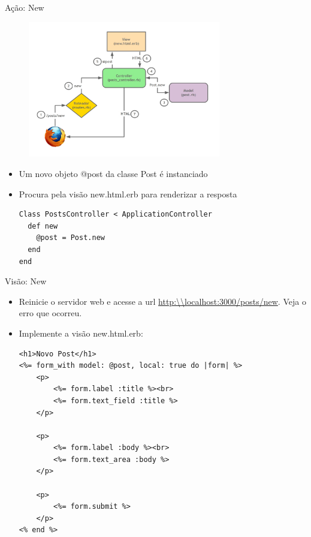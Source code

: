 \begin{frame}{Ação: New}
	\begin{figure}[h!]
		\centering
		\includegraphics[width=0.75\textwidth]{imagens/mvc-action-new.jpg}
	\end{figure}
	\framebreak
	\begin{itemize}
		\item Um novo objeto \alert{@post} da classe \alert{Post} é instanciado 
		\item Procura pela visão \alert{new.html.erb} para renderizar a resposta
		\begin{lstlisting}[style=RubyInputStyle, caption=app/controllers/posts\_controller.rb]
Class PostsController < ApplicationController
  def new
    @post = Post.new 
  end 
end
		\end{lstlisting}
	\end{itemize}
\end{frame}

\begin{frame}{Visão: New}
	\begin{itemize}
		\item Reinicie o servidor web e acesse a url \url{http:\\localhost:3000/posts/new}. Veja o erro que ocorreu.
		\item Implemente a visão \alert{new.html.erb}:
		\begin{lstlisting}[style=RubyInputStyle, caption=views/posts/new.html.erb]
<h1>Novo Post</h1>
<%= form_with model: @post, local: true do |form| %>
	<p>
		<%= form.label :title %><br>
		<%= form.text_field :title %>
	</p>
	
	<p>
		<%= form.label :body %><br>
		<%= form.text_area :body %>
	</p>
	
	<p>
		<%= form.submit %>
	</p>
<% end %>	
		\end{lstlisting}
	\end{itemize}	
\end{frame}